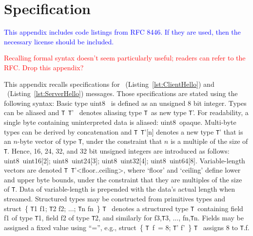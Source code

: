 \newcommand{\genericType}{\texttt{T}}

\newcommand{\TLSPrimitiveType}[1]{\textsf{#1}}

\newcommand{\uint}{\TLSPrimitiveType{uint8}}
\newcommand{\uintSixteen}{\TLSPrimitiveType{uint16}}
\newcommand{\uintTwentyFour}{\TLSPrimitiveType{uint24}}
\newcommand{\uintThirtyTwo}{\TLSPrimitiveType{uint32}}
\newcommand{\uintSixtyFour}{\TLSPrimitiveType{uint64}}
\newcommand{\opaque}{\TLSPrimitiveType{opaque}}

\newcommand{\struct}{\TLSPrimitiveType{struct}}
\newcommand{\genericField}{f}

\section{Specification}\label{sec:specification}

\textcolor{blue}{This appendix includes code listings from RFC 8446.  
  If they are used, then the necessary license should be included.}

\textcolor{red}{Recalling formal syntax doesn't seem particularly useful;
  readers can refer to the RFC. Drop this appendix?}
 


This appendix recalls specifications for \ClientHello\ (Listing~\ref{lst:ClientHello})
and \ServerHello\ (Listing~\ref{lst:ServerHello}) messages. Those specifications 
are stated using the following syntax: Basic type 
%
  \uint\
%
is defined as an unsigned 8 bit integer. Types can be aliased and 
%
  \genericType\ \genericType'\ 
%
denotes aliasing type \genericType\ as new type \genericType'. 
For readability, a single byte containing uninterpreted 
data is aliased:
%
  \uint\ \opaque.
%
Multi-byte types can be derived by concatenation and
%
  \genericType\ \genericType'[n]
%
denotes a new type \genericType' that is an $n$-byte 
vector of type \genericType, under the constraint that 
$n$ is a multiple of the size of \genericType. Hence, 16, 
24, 32, and 32 bit unsigned integers are introduced as follows:
%
  \uint\ \uintSixteen[2];
  \uint\ \uintTwentyFour[3];
  \uint\ \uintThirtyTwo[4];
  \uint\ \uintSixtyFour[8].
%
Variable-length vectors are denoted
%
  \genericType\ \genericType'\textless{}floor..ceiling\textgreater{},
%
where `floor' and `ceiling' define lower and upper byte
bounds, under the constraint that they are multiples of 
the size of \genericType.
Data of variable-length is prepended with the data's
actual length when streamed.
Structured types may be constructed from primitives types and 
%
  \struct~\{ \genericType1 \genericField1; \genericType2 \genericField2; ...; \genericType{}n \genericField{}n~\} \genericType\
%
denotes a structured type \genericType\ containing 
field \genericField1 of type \genericType1, 
field \genericField2 of type \genericType2, and 
similarly for \genericField3,\genericType3, ..., \genericField{}n,\genericType{}n. 
Fields may be assigned a fixed value using ``='', e.g., 
%
\struct~\{ 
  \genericType\ \genericField\ = 8; 
  \genericType' \genericField'~\} 
\genericType\ 
%
assigns 8 to \genericType.\genericField.


